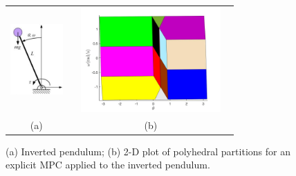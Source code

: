\begin{figure}[t]
	\begin{tabular}{cc}
	\includegraphics[width=2cm,height=3cm]{Figs/inv_pend.png}&	\includegraphics[width=6cm,height=4cm]{Figs/regs.jpg}\\
	(a)&(b)
	\end{tabular}
	\caption{(a) Inverted pendulum; (b) 2-D plot of polyhedral partitions for an explicit MPC applied to the inverted pendulum.}
	\label{fig:inverted_pendulum}
\end{figure}

